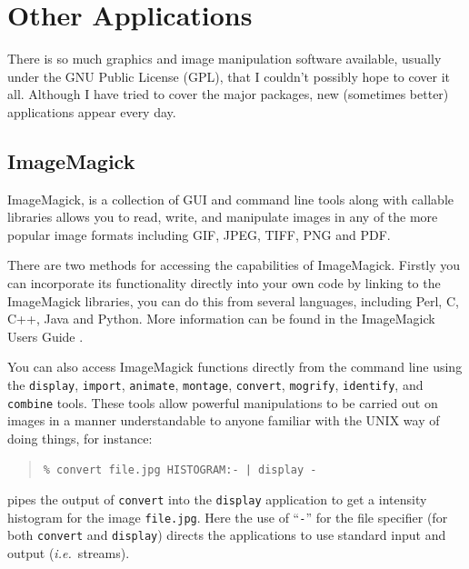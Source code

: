 \documentclass[twoside,11pt]{article}
\newcommand{\htmladdnormallink}[2]{#1}
\newcommand{\xlabel}[1]{}
\begin{document}
\section{\xlabel{sc15_applications}Other Applications\label{sc15_applications}}

There is so much graphics and image manipulation software available, usually under the \htmladdnormallink{GNU Public License}{http://www.gnu.org/copyleft/gpl.html} (GPL), that I couldn't possibly hope to cover it all. Although I have tried to cover the major packages, new (sometimes better) applications appear every day. 

\subsection{\xlabel{sc15_magick}ImageMagick\label{sc15_magick}}

\htmladdnormallink{ImageMagick}{http://www.wizards.dupont.com/cristy/ImageMagick.html}, is a collection of GUI and command line tools along with callable  libraries allows you to read, write, and manipulate images in any of the more popular image formats including GIF, JPEG, TIFF, PNG and PDF.  

There are two methods for accessing the capabilities of ImageMagick. Firstly you can incorporate its functionality directly into your own code by linking to the ImageMagick libraries, you can do this from several languages, including Perl, C, C++, Java and Python. More information can be found in the \htmladdnormallink{ImageMagick Users Guide}{http://www.wizards.dupont.com/cristy/ImageMagick.pdf} .

You can also access ImageMagick functions directly from the command line using the {\tt display}, {\tt import}, {\tt animate}, {\tt montage}, {\tt convert}, {\tt mogrify}, {\tt identify}, and {\tt combine} tools. These tools allow powerful manipulations to be carried out on images in a manner understandable to anyone familiar with the UNIX way of doing things, for instance:

\small
\begin{quote}
\begin{verbatim}
% convert file.jpg HISTOGRAM:- | display -
\end{verbatim}
\end{quote}
\normalsize

pipes the output of {\tt convert} into the {\tt display} application to get a intensity histogram for the image {\tt file.jpg}. Here the use of ``\verb+-+'' for the file specifier (for both {\tt convert} and {\tt display}) directs the applications to use standard input and output ({\em i.e.\ }streams).
    
\end{document}
